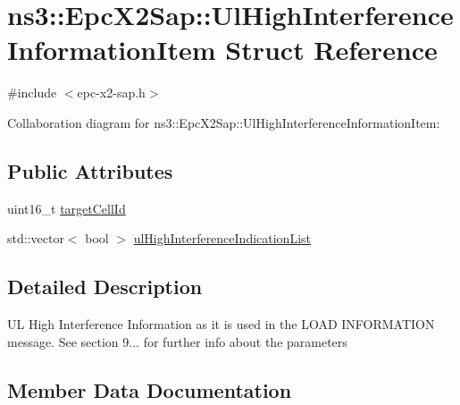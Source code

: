 \hypertarget{structns3_1_1EpcX2Sap_1_1UlHighInterferenceInformationItem}{}\section{ns3\+:\+:Epc\+X2\+Sap\+:\+:Ul\+High\+Interference\+Information\+Item Struct Reference}
\label{structns3_1_1EpcX2Sap_1_1UlHighInterferenceInformationItem}


{\ttfamily \#include $<$epc-\/x2-\/sap.\+h$>$}



Collaboration diagram for ns3\+:\+:Epc\+X2\+Sap\+:\+:Ul\+High\+Interference\+Information\+Item\+:
\subsection*{Public Attributes}
\begin{DoxyCompactItemize}
\item 
uint16\+\_\+t \hyperlink{structns3_1_1EpcX2Sap_1_1UlHighInterferenceInformationItem_a1d714b02be3560e21f9125f778f8bce9}{target\+Cell\+Id}
\item 
std\+::vector$<$ bool $>$ \hyperlink{structns3_1_1EpcX2Sap_1_1UlHighInterferenceInformationItem_ae37bd1661735b8534e29cb830c919f04}{ul\+High\+Interference\+Indication\+List}
\end{DoxyCompactItemize}


\subsection{Detailed Description}
UL High Interference Information as it is used in the L\+O\+AD I\+N\+F\+O\+R\+M\+A\+T\+I\+ON message. See section 9... for further info about the parameters 

\subsection{Member Data Documentation}
